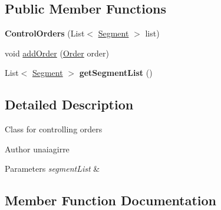 \subsection*{Public Member Functions}
\begin{DoxyCompactItemize}
\item 
\mbox{\label{classmondragon_1_1edu_1_1control_1_1_control_orders_adc15bcd924a5cd846171285f2d2f6204}} 
{\bfseries Control\+Orders} (List$<$ \mbox{\hyperlink{classmondragon_1_1edu_1_1clases_1_1_segment}{Segment}} $>$ list)
\item 
void \mbox{\hyperlink{classmondragon_1_1edu_1_1control_1_1_control_orders_a0b6a64a7c281a6d0e3555a56a9fe0637}{add\+Order}} (\mbox{\hyperlink{classmondragon_1_1edu_1_1clases_1_1_order}{Order}} order)
\item 
\mbox{\label{classmondragon_1_1edu_1_1control_1_1_control_orders_a2909cad286b55d5314c3b552fdcf6607}} 
List$<$ \mbox{\hyperlink{classmondragon_1_1edu_1_1clases_1_1_segment}{Segment}} $>$ {\bfseries get\+Segment\+List} ()
\end{DoxyCompactItemize}


\subsection{Detailed Description}
Class for controlling orders

\begin{DoxyAuthor}{Author}
unaiagirre 
\end{DoxyAuthor}

\begin{DoxyParams}{Parameters}
{\em segment\+List} & \\
\hline
\end{DoxyParams}


\subsection{Member Function Documentation}
\mbox{\label{classmondragon_1_1edu_1_1control_1_1_control_orders_a0b6a64a7c281a6d0e3555a56a9fe0637}} 

